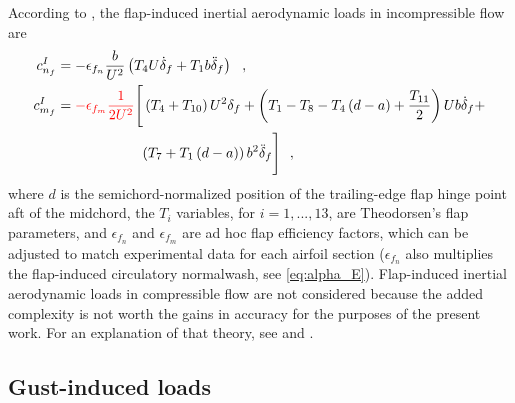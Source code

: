 \documentclass[12pt,a4paper,oneside,english]{abntex2} %
\newcommand{\fix}[1]{{\color{red}#1}}
\def\lp{\left(}
\def\rp{\right)}
\def\deltaf{\delta_f}
\def\deltafdot{\dot{\delta}_f}
\def\deltafddot{\ddot{\delta}_f}
\begin{document}
According to , the flap-induced inertial aerodynamic loads in incompressible flow are
\begin{align}
    c_{n_f}^{I} &= -\epsilon_{f_n}\frac{b}{U^2}  \lp T_4 U\deltafdot + T_1 b\deltafddot \rp
    \ \ , \label{eq:cnI_f}
    \\
    c_{m_f}^{I} &= \fix{-\epsilon_{f_m}\frac{1}{2U^2}} \Biggl[\Biggr. \lp T_4+T_{10} \rp U^2\deltaf + \lp T_1-T_8-T_4\lp d-a \rp+\frac{T_{11}}{2}\rp Ub\deltafdot + \nonumber
    \\
    & \hphantom{-\frac{\epsilon_{f_m}b}{2U^2} \Biggl\{\Biggr.\;\;\;\;\;\;\;\;} \lp T_7+T_1\lp d-a \rp \rp b^2\deltafddot \Biggl.\Biggr] \ \ ,
    \label{eq:cmI_f}
\end{align}
where $d$ is the semichord-normalized position of the trailing-edge flap hinge point aft of the midchord, the $T_i$ variables, for $i=1,...,13$, are Theodorsen's flap parameters, and $\epsilon_{f_n}$ and $\epsilon_{f_m}$ are ad hoc flap efficiency factors, which can be adjusted to match experimental data for each airfoil section \fix{($\epsilon_{f_n}$ also multiplies the flap-induced circulatory normalwash, see \cref{eq:alpha_E})}. Flap-induced inertial aerodynamic loads in compressible flow are not considered because the added complexity is not worth the gains in accuracy for the purposes of the present work. For an explanation of that theory, see  and .

\subsection{Gust-induced loads}
\label{subsec:gust_loads}
\end{document}

